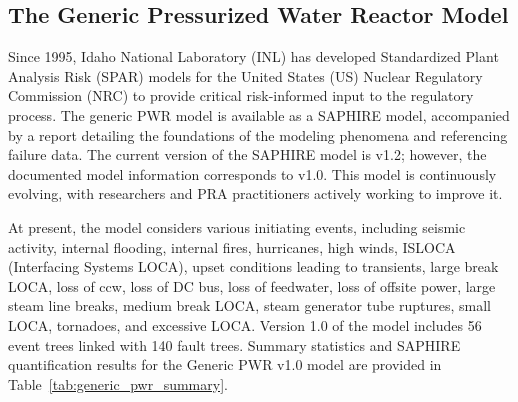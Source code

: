 \subsection{The Generic Pressurized Water Reactor Model}
\label{subsec:generic_pwr_dataset}

Since 1995, Idaho National Laboratory (INL) has developed Standardized Plant Analysis Risk (SPAR) models for the United States (US) Nuclear Regulatory Commission (NRC) to provide critical risk-informed input to the regulatory process. The generic PWR model is available as a SAPHIRE model, accompanied by a report detailing the foundations of the modeling phenomena and referencing failure data. The current version of the SAPHIRE model is v1.2; however, the documented model information corresponds to v1.0. This model is continuously evolving, with researchers and PRA practitioners actively working to improve it.

At present, the model considers various initiating events, including seismic activity, internal flooding, internal fires, hurricanes, high winds, ISLOCA (Interfacing Systems LOCA), upset conditions leading to transients, large break LOCA, loss of \acrfull{ccw}, loss of DC bus, loss of feedwater, loss of offsite power, large steam line breaks, medium break LOCA, steam generator tube ruptures, small LOCA, tornadoes, and excessive LOCA. Version 1.0 of the model includes 56 event trees linked with 140 fault trees. Summary statistics and SAPHIRE quantification results for the Generic PWR v1.0 model are provided in Table~\ref{tab:generic_pwr_summary}.

\begin{landscape}

\end{landscape}